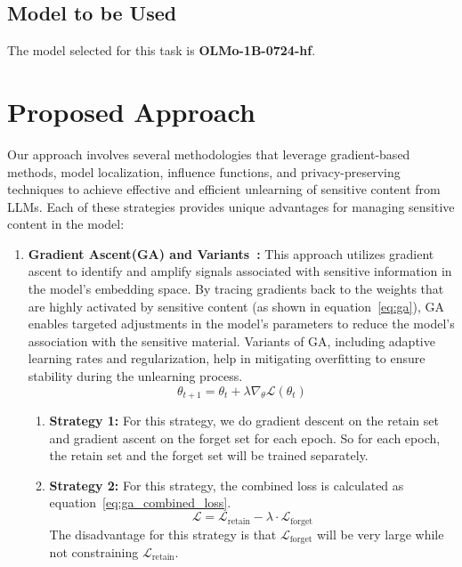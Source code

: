 \documentclass[11pt]{article}
\begin{document}
    \subsection{Model to be Used}
    The model selected for this task is \textbf{OLMo-1B-0724-hf}.


    \section{Proposed Approach}
    Our approach involves several methodologies that leverage gradient-based methods, model localization, influence functions, and privacy-preserving techniques to achieve effective and efficient unlearning of sensitive content from LLMs. Each of these strategies provides unique advantages for managing sensitive content in the model:
    \begin{enumerate}
        \item \textbf{Gradient Ascent(GA) and Variants~\cite{yao2024largelanguagemodelunlearning}:} This approach utilizes gradient ascent to identify and amplify signals associated with sensitive information in the model's embedding space. By tracing gradients back to the weights that are highly activated by sensitive content (as shown in equation~\ref{eq:ga}), GA enables targeted adjustments in the model's parameters to reduce the model’s association with the sensitive material. Variants of GA, including adaptive learning rates and regularization, help in mitigating overfitting to ensure stability during the unlearning process.
        \begin{equation}
            \theta_{t+1} = \theta_t + \lambda \nabla_{\theta} \mathcal{L}(\theta_t)
            \label{eq:ga}
        \end{equation}

        \begin{enumerate}
            \item{\textbf{Strategy 1:}}
            For this strategy, we do gradient descent on the retain set and gradient ascent on the forget set for each epoch. So for each epoch, the retain set and the forget set will be trained separately.

            \item{\textbf{Strategy 2:}}
            For this strategy, the combined loss is calculated as equation~\ref{eq:ga_combined_loss}.
            \begin{equation}
                \mathcal{L} = \mathcal{L}_{\text{retain}} - \lambda\cdot\mathcal{L}_{\text{forget}}
                \label{eq:ga_combined_loss}
            \end{equation}
            The disadvantage for this strategy is that $\mathcal{L}_\text{forget}$ will be very large while not constraining $\mathcal{L}_\text{retain}$.


\end{enumerate}
\end{enumerate}
\end{document}
